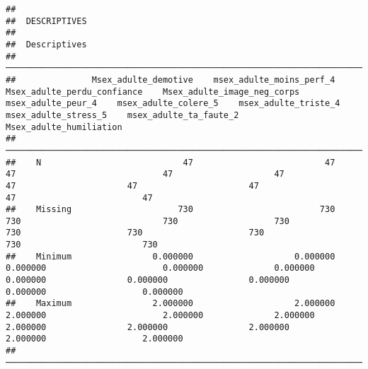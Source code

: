 \documentclass[
]{article}
\begin{document}
\begin{verbatim}
## 
##  DESCRIPTIVES
## 
##  Descriptives                                                                                                                                                                                                                                                                     
##  ──────────────────────────────────────────────────────────────────────────────────────────────────────────────────────────────────────────────────────────────────────────────────────────────────────────────────────────────────────────────────────────────────────────────── 
##               Msex_adulte_demotive    msex_adulte_moins_perf_4    Msex_adulte_perdu_confiance    Msex_adulte_image_neg_corps    msex_adulte_peur_4    msex_adulte_colere_5    msex_adulte_triste_4    msex_adulte_stress_5    msex_adulte_ta_faute_2    Msex_adulte_humiliation   
##  ──────────────────────────────────────────────────────────────────────────────────────────────────────────────────────────────────────────────────────────────────────────────────────────────────────────────────────────────────────────────────────────────────────────────── 
##    N                            47                          47                             47                             47                    47                      47                      47                      47                        47                         47   
##    Missing                     730                         730                            730                            730                   730                     730                     730                     730                       730                        730   
##    Minimum                0.000000                    0.000000                       0.000000                       0.000000              0.000000                0.000000                0.000000                0.000000                  0.000000                   0.000000   
##    Maximum                2.000000                    2.000000                       2.000000                       2.000000              2.000000                2.000000                2.000000                2.000000                  2.000000                   2.000000   
##  ────────────────────────────────────────────────────────────────────────────────────────────────────────────────────────────────────────────────────────────────────────────────────────────────────────────────────────────────────────────────────────────────────────────────
\end{verbatim}
\end{document}
